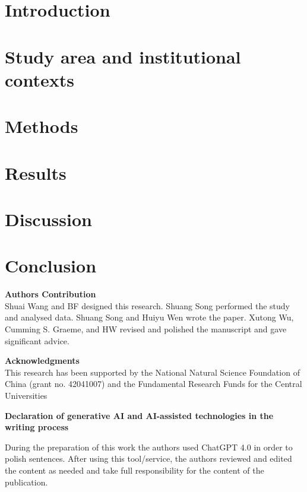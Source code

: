 \documentclass[preprint, 12pt]{elsarticle}
\begin{document}
\section{Introduction}\label{sec:introduction}


\section{Study area and institutional contexts}\label{sec:yrb}


\section{Methods}\label{sec:methods}


\section{Results}\label{sec:results}



\section{Discussion}\label{sec:discussion}


\section{Conclusion}\label{sec:conclusion}


\textbf{Authors Contribution}\\
Shuai Wang and BF designed this research. Shuang Song performed the study and analysed data. Shuang Song and Huiyu Wen wrote the paper. Xutong Wu, Cumming S. Graeme, and HW revised and polished the manuscript and gave significant advice.

\textbf{Acknowledgments}\\
This research has been supported by the National Natural Science Foundation of China (grant no. 42041007) and the Fundamental Research Funds for the Central Universities

\textbf{Declaration of generative AI and AI-assisted technologies in the writing process}

During the preparation of this work the authors used ChatGPT 4.0 in order to polish sentences. After using this tool/service, the authors reviewed and edited the content as needed and take full responsibility for the content of the publication.
\end{document}
